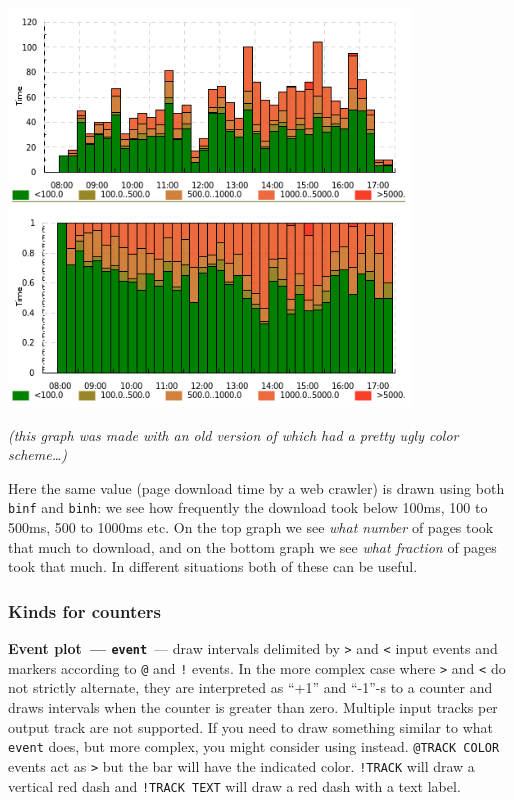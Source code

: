 \documentclass{article}
\begin{document}
{\centering \includegraphics[width=0.8\textwidth]{pics/tplot/binf-binh.png}}

\emph{(this graph was made with an old version of \timeplot{} which had a pretty ugly color scheme\ldots)}

Here the same value (page download time by a web crawler) is drawn using both \texttt{binf} and \texttt{binh}: we see how frequently the download took below 100ms, 100 to 500ms, 500 to 1000ms etc. On the top graph we see \emph{what number} of pages took that much to download, and on the bottom graph we see \emph{what fraction} of pages took that much. In different situations both of these can be useful.

\pagebreak
\subsubsection{Kinds for counters}
\noindent
\textbf{Event plot~--- \texttt{event}}~--- draw intervals delimited by \texttt{>} and \texttt{<} input events and markers according to \texttt{@} and \texttt{!} events. In the more complex case where \texttt{>} and \texttt{<} do not strictly alternate, they are interpreted as ``+1'' and ``-1''-s to a counter and \timeplot{} draws intervals when the counter is greater than zero. Multiple input tracks per output track are not supported. If you need to draw something similar to what \texttt{event} does, but more complex, you might consider using \splot{} instead. \texttt{@TRACK COLOR} events act as \texttt{>} but the bar will have the indicated color. \texttt{!TRACK} will draw a vertical red dash and \texttt{!TRACK TEXT} will draw a red dash with a text label. 
\end{document}
